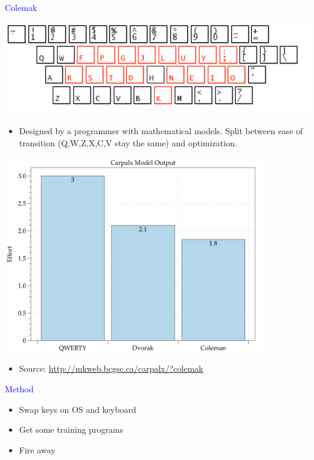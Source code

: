 \documentclass[landscape]{slides}
\begin{document}
\begin{slide}

    \textcolor{blue}{\Large{Colemak}}

    \centering
    \includegraphics[width=20cm]{colemak-annot}

    \begin{itemize}
        \item Designed by a programmer with mathematical models. Split between ease of transition (Q,W,Z,X,C,V stay the same) and optimization.
    \end{itemize}

\end{slide}


\begin{slide}

    \centering

    \includegraphics[width=0.85\textwidth]{keyboards}

    \begin{itemize}
        \item Source: \url{http://mkweb.bcgsc.ca/carpalx/?colemak}
    \end{itemize}

\end{slide}


\begin{slide}

    \textcolor{blue}{\Large{Method}}

    \begin{itemize}
        \item Swap keys on OS and keyboard
        \item Get some training programs
        \item Fire away
    \end{itemize}

\end{slide}
\end{document}
